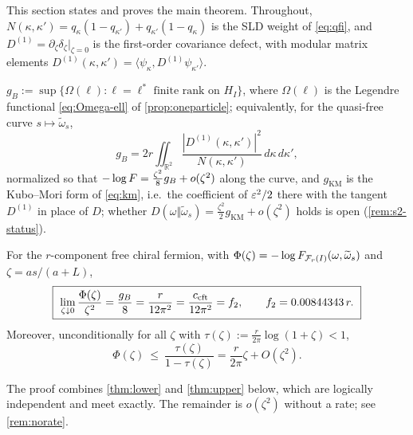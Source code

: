\label{sec:quadratic}
This section states and proves the main theorem.  Throughout,
$N(\kappa,\kappa')=q_\kappa(1-q_{\kappa'})+q_{\kappa'}(1-q_\kappa)$ is the SLD
weight of \eqref{eq:qfi}, and $D^{(1)}=\partial_\zeta\delta_\zeta|_{\zeta=0}$ is the
first-order covariance defect, with modular matrix elements
$D^{(1)}(\kappa,\kappa')=\langle\psi_\kappa,D^{(1)}\psi_{\kappa'}\rangle$.

\begin{definition}\label{def:gB}
$\displaystyle
 g_B:=\sup\bigl\{\Omega(\ell):\ell=\ell^*\text{ finite rank on }H_I\bigr\}$, where
$\Omega(\ell)$ is the Legendre functional \eqref{eq:Omega-ell} of \cref{prop:oneparticle}; equivalently, for
the quasi-free curve $s\mapsto\widetilde\omega_s$,
\begin{equation}\label{eq:gB-int}
 g_B=2r\iint_{\mathbb R^2}\frac{|D^{(1)}(\kappa,\kappa')|^2}{N(\kappa,\kappa')}
 \,d\kappa\,d\kappa' ,
\end{equation}
normalized so that $-\log F=\frac{\zeta^2}8g_B+o(\zeta^2)$ along the curve, and
$g_{\mathrm{KM}}$ is the Kubo--Mori form of \eqref{eq:km}, i.e.\ the coefficient of $\varepsilon^2/2$ there with the tangent $D^{(1)}$ in place of $D$; whether
$D(\omega\Vert\widetilde\omega_s)=\frac{\zeta^2}2g_{\mathrm{KM}}+o(\zeta^2)$ holds is open (\cref{rem:s2-status}).
\end{definition}

\begin{theorem}\label{thm:main}
For the $r$-component free chiral fermion, with
$\Phi(\zeta)=-\log F_{\mathcal F_r(I)}(\omega,\widetilde\omega_s)$ and $\zeta=as/(a+L)$,
\begin{equation}\label{eq:main}
 \boxed{\ \lim_{\zeta\downarrow0}\frac{\Phi(\zeta)}{\zeta^2}=\frac{g_B}8
 =\frac r{12\pi^2}=\frac{c_{\rm cft}}{12\pi^2}=f_2,\qquad
 f_2=0.00844343\,r.\ }
\end{equation}
Moreover, unconditionally for all $\zeta$ with
$\tau(\zeta):=\frac r{2\pi}\log(1+\zeta)<1$,
\begin{equation}\label{eq:unconditional}
 \Phi(\zeta)\ \le\ \frac{\tau(\zeta)}{1-\tau(\zeta)}=\frac r{2\pi}\zeta+O(\zeta^2).
\end{equation}
\end{theorem}

The proof combines \cref{thm:lower} and \cref{thm:upper} below, which are
logically independent and meet exactly.  The remainder is $o(\zeta^2)$ without a
rate; see \cref{rem:norate}.

